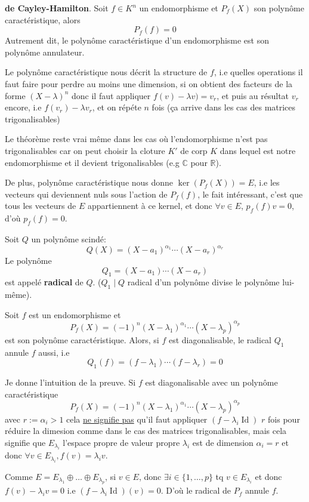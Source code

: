 \begin{theorem}\label{thm:cayley-hamilton} \textbf{de Cayley-Hamilton}. Soit $f \in K^n$ un endomorphisme et $P_f(X)$ son polynôme caractéristique, alors
     \[
    P_f(f) = 0
    \] 
    Autrement dit, le polynôme caractéristique d'un endomorphisme est son polynôme annulateur.
\end{theorem}
\begin{intuition}
   Le polynôme caractéristique nous décrit la structure de $f$, i.e quelles operations il faut faire pour perdre au moins une dimension, si on obtient des facteurs de la forme $(X - \lambda)^n$ donc il faut appliquer  $f(v) - \lambda v) = v_r$, et puis au résultat $v_r$ encore, i.e  $f(v_r) - \lambda v_r$, et on répéte  $n$ fois (ça arrive dans les cas des matrices trigonalisables) 

   Le théorème reste vrai même dans les cas où l'endomorphisme n'est pas trigonalisables car on peut choisir la cloture $K'$ de corp  $K$ dans lequel est notre endomorphisme et il devient trigonalisables (e.g $\mathbb{C}$ pour  $\mathbb{R}$).

   De plus, polynôme caractéristique nous donne  $\ker(P_f(X)) = E$, i.e les vecteurs qui deviennent nuls sous l'action de  $P_f(f)$, le fait intéressant, c'est que tous les vecteurs de  $E$ appartiennent à ce kernel, et donc  $\forall v \in E$, $p_f(f)v = 0$, d'où  $p_f(f) = 0$.
\end{intuition}

\begin{definition}
    Soit $Q$ un polynôme scindé:
     \[
         Q(X) = (X - a_1)^{\alpha_1} \cdots (X - a_r)^{\alpha_r}
    \] 
    Le polynôme 
    \[
    Q_1 = (X - a_1) \cdots (X - a_r)
    \] 
    est appelé \textbf{radical} de $Q$. ($Q_1 \mid Q$ radical d'un polynôme divise le polynôme lui-même).
\end{definition}
\begin{prop}
    Soit $f$ est un endomorphisme et 
     \[
         P_f(X) = (-1)^n(X - \lambda_1)^{\alpha_1} \cdots (X - \lambda_p)^{\alpha_p}
    \] 
    est son polynôme caractéristique. Alors, si $f$ est diagonalisable, le radical  $Q_1$ annule  $f$ aussi, i.e
     \[
    Q_1(f) = (f - \lambda_1) \cdots (f - \lambda_r) = 0
    \] 
\end{prop}
\begin{intuition}
   Je donne l'intuition de la preuve. Si $f$ est diagonalisable avec un polynôme caractéristique
     \[
         P_f(X) = (-1)^n(X - \lambda_1)^{\alpha_1} \cdots (X - \lambda_p)^{\alpha_p}
    \] 
    avec $r := \alpha_i > 1$ cela \underline{ne signifie pas} qu'il faut appliquer $(f - \lambda_i \operatorname{Id})$  $r$ fois pour réduire la dimesion comme dans le cas des matrices trigonalisables, mais cela signifie que  $E_{\lambda_i}$ l'espace propre de valeur propre  $\lambda_i$ est de dimension  $\alpha_i = r$ et donc $\forall v \in E_{\lambda_i}, f(v) = \lambda_i v$. 

    Comme $E = E_{\lambda_1} \oplus \ldots \oplus E_{\lambda_p}$, si $v \in E$, donc $\exists i \in \{1, \ldots, p\}$ tq $v \in E_{\lambda_i}$ et donc $f(v) - \lambda_i v = 0$ i.e  $(f - \lambda_i \operatorname{Id})(v) = 0$. D'où le radical de $P_f$ annule  $f$.
\end{intuition}
